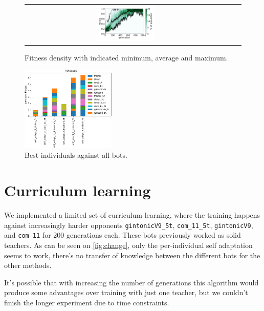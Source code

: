 \documentclass[11pt,a4paper]{scrartcl}
\begin{document}
\begin{figure}[H]
\begin{tabular}{ccc}
\includegraphics[width=0.3\textwidth]{img/self_adapt_2_trainer_5t.png}
\end{tabular}
\caption{Fitness density with indicated minimum, average and maximum.}
\label{fig:self_adapt_2_5t}
\end{figure}

\begin{figure}[H]
\center
\includegraphics[width=0.4\textwidth]{img/self_adapt_2_5t.png}
\caption{Best individuals against all bots.}
\label{fig:self_adapt_2_5t_aa}
\end{figure}

\section{Curriculum learning}

We implemented a limited set of curriculum learning, where the training happens against increasingly harder opponents \texttt{gintonicV9\_5t}, \texttt{com\_11\_5t}, \texttt{gintonicV9}, and \texttt{com\_11} for 200 generations each. These bots previously worked as solid teachers. As can be seen on \ref{fig:change}, only the per-individual self adaptation seems to work, there's no transfer of knowledge between the different bots for the other methods.

It's possible that with increasing the number of generations this algorithm would produce some advantages over training with just one teacher, but we couldn't finish the longer experiment due to time constraints.
\end{document}

